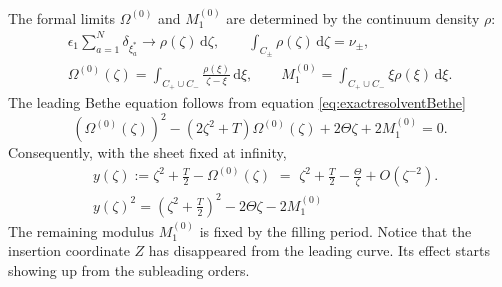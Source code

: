 \documentclass[a4paper,11pt]{article}
\newcommand{\dd}{\mathrm{d}}
\numberwithin{equation}{section}
\begin{document}
The formal limits $\Omega^{(0)}$ and $M_{1}^{(0)}$ are
determined by the continuum density $\rho$:
\begin{equation}
	\label{equation:PII chapter7 density and fillings}
	\begin{gathered}
		\epsilon_{1}\sum_{a=1}^{N}\delta_{\xi_{a}^{*}}
		\longrightarrow\rho(\zeta)\,\dd\zeta,\qquad
		\int_{C_{\pm}}\rho(\zeta)\,\dd\zeta=\nu_{\pm},\\
		\Omega^{(0)}(\zeta)=\int_{C_{+}\cup C_{-}}
		\frac{\rho(\xi)}{\zeta-\xi}\,\dd\xi,\qquad
		M_{1}^{(0)}=\int_{C_{+}\cup C_{-}}\xi\rho(\xi)\,\dd\xi.
	\end{gathered}
\end{equation}
The leading Bethe equation follows from equation \eqref{eq:exactresolventBethe}
\begin{equation}
	\label{equation:PII chapter7 leading loop}
	\left(\Omega^{(0)}(\zeta)\right)^{2}
	-(2\zeta^{2}+T)\Omega^{(0)}(\zeta)+2\Theta\zeta+2M_{1}^{(0)}=0.
\end{equation}
Consequently, with the sheet fixed at infinity,
\begin{equation}
	\label{equation:PII chapter7 y curve}
	\begin{split}
		&y(\zeta):=\zeta^{2}+\frac{T}{2}-\Omega^{(0)}(\zeta) \, \, = \,\,
		\zeta^{2}+\frac{T}{2}-\frac{\Theta}{\zeta} +O\left(\zeta^{-2}\right).\\
	& y(\zeta)^{2}=\left(\zeta^{2}+\frac{T}{2}\right)^{2}
		-2\Theta\zeta-2M_{1}^{(0)}
    \end{split}        
\end{equation}
The remaining modulus $M_{1}^{(0)}$ is fixed by the filling period. Notice that the insertion coordinate $Z$ has disappeared from the leading curve. Its effect starts showing up from the subleading orders. 
\end{document}
